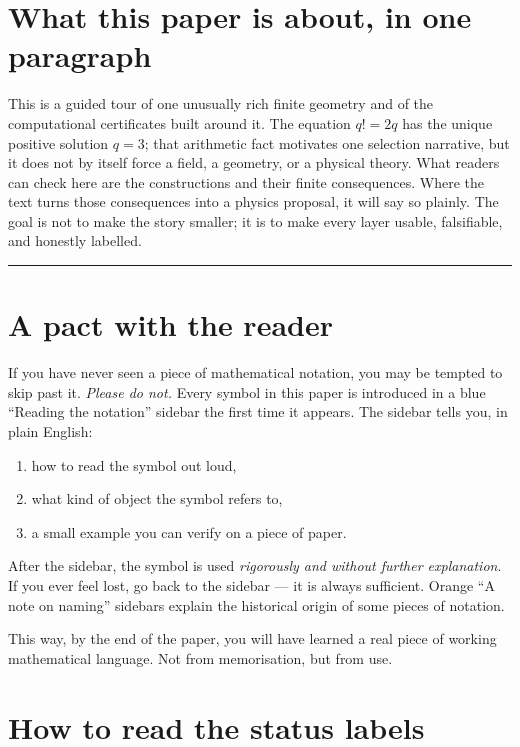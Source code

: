 \documentclass[11pt]{article}
\begin{document}
\section*{What this paper is about, in one paragraph}

This is a guided tour of one unusually rich finite geometry and of the computational certificates built around it.  The equation $q!=2q$ has the unique positive solution $q=3$; that arithmetic fact motivates one selection narrative, but it does not by itself force a field, a geometry, or a physical theory.  What readers can check here are the constructions and their finite consequences.  Where the text turns those consequences into a physics proposal, it will say so plainly.  The goal is not to make the story smaller; it is to make every layer usable, falsifiable, and honestly labelled.

\vspace{1em}
\noindent\rule{0.98\linewidth}{0.4pt}
\vspace{1em}

\section*{A pact with the reader}

If you have never seen a piece of mathematical notation, you may be tempted to skip past it. \emph{Please do not.} Every symbol in this paper is introduced in a blue ``Reading the notation'' sidebar the first time it appears. The sidebar tells you, in plain English:
\begin{enumerate}[label=(\arabic*),leftmargin=2em]
\item how to read the symbol out loud,
\item what kind of object the symbol refers to,
\item a small example you can verify on a piece of paper.
\end{enumerate}
After the sidebar, the symbol is used \emph{rigorously and without further explanation}. If you ever feel lost, go back to the sidebar --- it is always sufficient. Orange ``A note on naming'' sidebars explain the historical origin of some pieces of notation.

This way, by the end of the paper, you will have learned a real piece of working mathematical language. Not from memorisation, but from use.

\section*{How to read the status labels}
\end{document}
